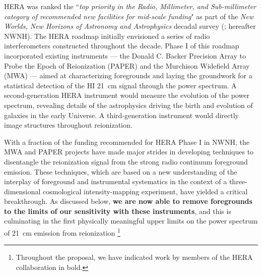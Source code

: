 \documentclass[preprint]{aastex}
\newcommand{\Mycitep}[1]{{\bf \citep{#1}}}
\begin{document}
HERA was ranked the ``{\it top priority in the Radio, Millimeter, and
Sub-millimeter category of recommended new facilities for mid-scale
funding}" as part of the {\it New Worlds, New Horizons of Astronomy
and Astrophysics} decadal survey (\citealt{astro2010}; hereafter
NWNH).  The HERA roadmap initially envisioned a series of radio
interferometers constructed throughout the decade. Phase I of this roadmap
incorporated existing instruments --- the Donald C. Backer Precision Array to Probe the Epoch of
Reionization (PAPER) and the Murchison Widefield Array (MWA) ---
aimed at characterizing foregrounds and laying the
groundwork for a statistical detection of the HI 21~cm signal through
the power spectrum.  A second-generation HERA instrument would measure
the evolution of the power spectrum, revealing details of the astrophysics driving
the birth and evolution of galaxies 
in the early Universe. A third-generation instrument would
directly image structures throughout reionization.

With a fraction of the funding recommended for HERA Phase I
in NWNH, the MWA and PAPER projects have made
major strides in developing techniques to disentangle
the reionization signal from the strong radio continuum foreground
emission.  These techniques, which are based on a new
understanding of the interplay of foreground and instrumental systematics
in the context of a three-dimensional cosmological intensity-mapping experiment,
have yielded a critical breakthrough.  As discussed below, {\bf we are now able to remove 
foregrounds to the limits of our sensitivity with these instruments},
and this is culminating in the first physically meaningful upper limits
on the power spectrum of 21~cm emission from reionization \Mycitep{parsons_et_al2013}\footnote{Throughout the proposal, we have indicated work by members of the HERA collaboration in bold.}


\end{document}

